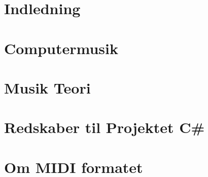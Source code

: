 %
%
%
%
% 


\pagestyle{empty} %


\cleardoublepage
{}
\pagestyle{fancy} %
\tableofcontents
\listoftodos
\cleardoublepage
\section{Indledning}

\section{Computermusik}

\section{Musik Teori}

\section{Redskaber til Projektet C\#}

\section{Om MIDI formatet}

